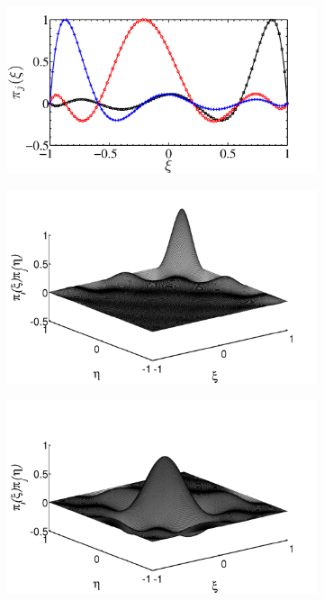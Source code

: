 \documentclass[times]{fldauth}
\begin{document}
\begin{figure}
\centering
        \begin{subfigure}[b]{0.65\textwidth}
                \includegraphics[width=\linewidth]{Figure/legpoly2.pdf}
                \caption{}
                \label{fig:poly1}
        \end{subfigure}
          \begin{subfigure}[b]{0.45\textwidth}
         \centering
                \includegraphics[width=\linewidth]{Figure/legpoly_2D1.pdf}
                 \caption{}
                 \label{fig:poly2}
         \end{subfigure}%
         \begin{subfigure}[b]{0.45\textwidth}
         \centering
                \includegraphics[width=\linewidth]{Figure/legpoly_2D2.pdf}

\end{subfigure}
\end{figure}
\end{document}
